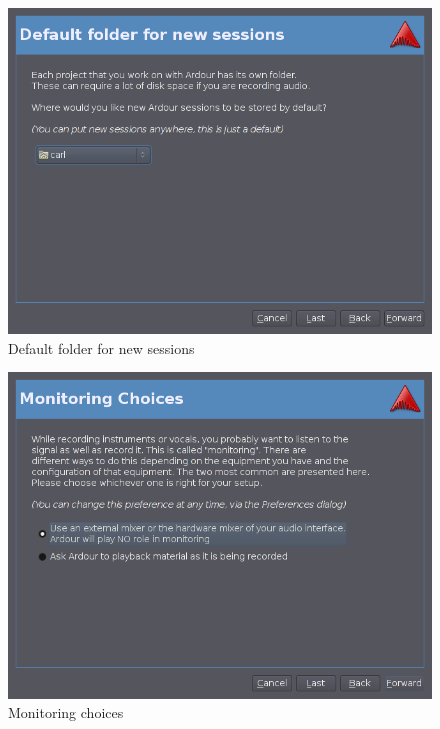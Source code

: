 \documentclass{book}
\begin{document}
\begin{figure}[ht]
\begin{center}
\includegraphics[scale=0.5]{screenshots/default-folder-for-new-sessions.png}
\end{center}
\caption{Default folder for new sessions}
\label{fig:default-folder-for-new-sessions}
\end{figure}

\begin{figure}[ht]
\begin{center}
\includegraphics[scale=0.5]{screenshots/monitoring-choices.png}
\end{center}
\caption{Monitoring choices}
\label{fig:monitoring-choices}
\end{figure}
\end{document}
